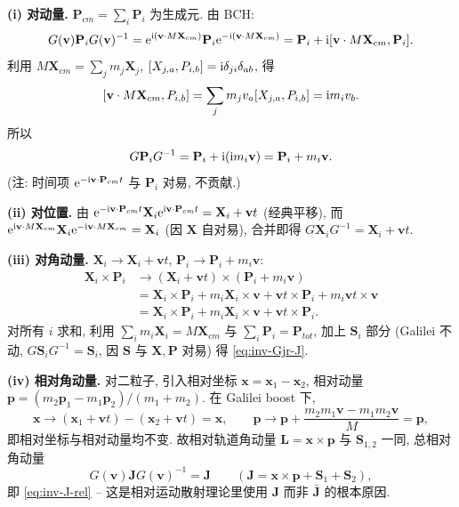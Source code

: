 \begin{proof*}
\textbf{(i) 对动量.} $\mathbf{P}_{cm}=\sum_i \mathbf{P}_i$ 为生成元. 由 BCH:
\[
G(\mathbf{v})\mathbf{P}_i G(\mathbf{v})^{-1}=\mathrm{e}^{\mathrm{i} (\mathbf{v}\cdot M\mathbf{X}_{cm})}\mathbf{P}_i \mathrm{e}^{-\mathrm{i} (\mathbf{v}\cdot M\mathbf{X}_{cm})}=\mathbf{P}_i +\mathrm{i}[\mathbf{v}\cdot M\mathbf{X}_{cm},\mathbf{P}_i].
\]
利用 $M\mathbf{X}_{cm}=\sum_j m_j \mathbf{X}_j$, $[X_{j,a}, P_{i,b}]=\mathrm{i} \delta_{ji}\delta_{ab}$, 得
\[
[\mathbf{v}\cdot M\mathbf{X}_{cm}, P_{i,b}]=\sum_j m_j v_a [X_{j,a},P_{i,b}]=\mathrm{i} m_i v_b.
\]
所以
\[
G\mathbf{P}_iG^{-1}=\mathbf{P}_i+\mathrm{i}(\mathrm{i} m_i \mathbf{v})=\mathbf{P}_i+m_i\mathbf{v}.
\]
(注: 时间项 $\mathrm{e}^{-\mathrm{i} \mathbf{v}\cdot \mathbf{P}_{cm}t}$ 与 $\mathbf{P}_i$ 对易, 不贡献.)

\textbf{(ii) 对位置.} 由 $\mathrm{e}^{-\mathrm{i} \mathbf{v}\cdot \mathbf{P}_{cm}t}\mathbf{X}_i \mathrm{e}^{\mathrm{i} \mathbf{v}\cdot \mathbf{P}_{cm}t}=\mathbf{X}_i+\mathbf{v}t$ (经典平移), 而 $\mathrm{e}^{\mathrm{i} \mathbf{v}\cdot M\mathbf{X}_{cm}}\mathbf{X}_i \mathrm{e}^{-\mathrm{i} \mathbf{v}\cdot M\mathbf{X}_{cm}}=\mathbf{X}_i$ (因 $\mathbf{X}$ 自对易), 合并即得 $G\mathbf{X}_iG^{-1}=\mathbf{X}_i+\mathbf{v}t$.

\textbf{(iii) 对角动量.}
$\mathbf{X}_i\to \mathbf{X}_i+\mathbf{v}t$, $\mathbf{P}_i\to \mathbf{P}_i+m_i\mathbf{v}$:
\begin{align*}
\mathbf{X}_i\times\mathbf{P}_i &\to (\mathbf{X}_i+\mathbf{v}t)\times (\mathbf{P}_i+m_i\mathbf{v})\\
&=\mathbf{X}_i\times \mathbf{P}_i + m_i \mathbf{X}_i\times \mathbf{v}+\mathbf{v}t\times \mathbf{P}_i+m_i \mathbf{v}t\times \mathbf{v}\\
&= \mathbf{X}_i\times \mathbf{P}_i+m_i\mathbf{X}_i\times\mathbf{v}+\mathbf{v}t\times \mathbf{P}_i.
\end{align*}
对所有 $i$ 求和, 利用 $\sum_i m_i \mathbf{X}_i=M\mathbf{X}_{cm}$ 与 $\sum_i \mathbf{P}_i=\mathbf{P}_{tot}$, 加上 $\mathbf{S}_i$ 部分 (Galilei 不动, $G\mathbf{S}_iG^{-1}=\mathbf{S}_i$, 因 $\mathbf{S}$ 与 $\mathbf{X},\mathbf{P}$ 对易) 得 \eqref{eq:inv-Gjr-J}.

\textbf{(iv) 相对角动量.}
对二粒子, 引入相对坐标 $\mathbf{x}=\mathbf{x}_1-\mathbf{x}_2$, 相对动量 $\mathbf{p}=(m_2 \mathbf{p}_1-m_1\mathbf{p}_2)/(m_1+m_2)$. 在 Galilei boost 下,
\[
\mathbf{x}\to (\mathbf{x}_1+\mathbf{v}t)-(\mathbf{x}_2+\mathbf{v}t)=\mathbf{x},\qquad \mathbf{p}\to \mathbf{p}+\frac{m_2 m_1\mathbf{v}-m_1 m_2 \mathbf{v}}{M}=\mathbf{p},
\]
即相对坐标与相对动量均不变. 故相对轨道角动量 $\mathbf{L}=\mathbf{x}\times\mathbf{p}$ 与 $\mathbf{S}_{1,2}$ 一同, 总相对角动量
\begin{equation}\label{eq:inv-J-rel}
G(\mathbf{v})\mathbf{J}G(\mathbf{v})^{-1}=\mathbf{J}\qquad (\mathbf{J}=\mathbf{x}\times\mathbf{p}+\mathbf{S}_1+\mathbf{S}_2),
\end{equation}
即 \eqref{eq:inv-J-rel} -- 这是相对运动散射理论里使用 $\mathbf{J}$ 而非 $\bar{\mathbf{J}}$ 的根本原因.
\end{proof*}


